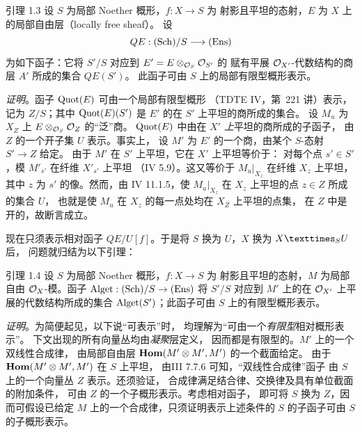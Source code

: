 \begin{enonce*}{引理 1.3}
设 $S$ 为局部 Noether 概形，$f:X\rightarrow S$ 为
射影且平坦的态射，$E$ 为 $X$ 上的局部自由层（locally free sheaf）。
设
$$
QE:(\operatorname{Sch})/S\longrightarrow(\operatorname{Ens})
$$
为如下函子：它将 $S'/S$ 对应到 $E'=E\otimes_{{\mathcal O}_S}{\mathcal O}_{S'}$ 的
赋有平展 ${\mathcal O}_{X'}$-代数结构的商层 $A'$ 所成的集合 $QE(S')$。
此函子可由 $S$ 上的局部有限型概形表示。
\end{enonce*}

\noindent
\emph{证明}。\pageoriginale 函子 $\protect\mathcal{\operatorname{Quot}}(E)$ 可由一个局部有限型概形
（TDTE IV，第~221 讲）表示，记为 $Z/S$；其中
$\protect\mathcal{\operatorname{Quot}}(E)(S')$ 是 $E'$ 的在 $S'$ 上平坦的商所成的集合。
设 $M_u$ 为 $X_Z$ 上 $E\otimes_{{\mathcal O}_S}{\mathcal O}_Z$ 的“泛”商。
$\protect\mathcal{\operatorname{Quot}}(E)$ 中由在 $X'$ \emph{上}平坦的商所成的子函子，
由 $Z$ 的一个开子集 $U$ 表示。事实上，
设 $M'$ 为 $E'$ 的一个商，由某个 $S$-态射 $S'\rightarrow Z$ 给定。
由于 $M'$ 在 $S'$ 上平坦，它在 $X'$ 上平坦等价于：
对每个点 $s'\in S'$，模 $M'_{s'}$ 在纤维 $X'_{s'}$ 上平坦
（\EGA IV 5.9）。这又等价于
$M_u|_{X_z}$ 在纤维 $X_z$ 上平坦，其中 $z$ 为
$s'$ 的像。然而，由 \EGA IV 11.1.5，使
$M_u|_{X_z}$ 在 $X_z$ 上平坦的点 $z\in Z$ 所成的集合 $U$，
也就是使 $M_u$ 在 $X_z$ 的每一点处均在 $X_Z$ 上平坦的点集，
在 $Z$ 中是开的，故断言成立。

现在只须表示相对函子 $QE/U[f]$。于是将
$S$ 换为 $U$，$X$ 换为 $\fprod{X}{U}{S}$ 后，
问题就归结为以下引理：

\begin{enonce*}{引理 1.4}
设 $S$ 为局部 Noether 概形，$f:X\rightarrow S$ 为
射影且平坦的态射，$M$ 为局部自由
${\mathcal O}_X$-模。函子
$\operatorname{Alget}:(\operatorname{Sch})/S\rightarrow(\operatorname{Ens})$ 将 $S'/S$ 对应到
$M'$ 上的在 ${\mathcal O}_{X'}$ 上平展的代数结构所成的集合
$\operatorname{Alget}(S')$；此函子可由 $S$ 上的有限型概形表示。
\end{enonce*}

\noindent
\emph{证明}。为简便起见，以下说“可表示”时，
均理解为“可由一个\emph{有限型}相对概形表示”。
下文出现的所有向量丛均由\emph{凝聚}层定义，
因而都是有限型的。$M'$ 上的一个双线性合成律，
由局部自由层 $\operatorname{\mathbf{Hom}}(M'\otimes M',M')$ 的一个截面给定。
由于 $\operatorname{\mathbf{Hom}}(M'\otimes M',M')$ 在 $S$ 上平坦，
由\pageoriginale \EGA III 7.7.6 可知，“双线性合成律”函子
由 $S$ 上的一个向量丛 $Z$ 表示。还须验证，
合成律满足结合律、交换律及具有单位截面的附加条件，
可由 $Z$ 的一个子概形表示。考虑相对函子，
即可将 $S$ 换为 $Z$，因而可假设已给定
$M$ 上的一个合成律，只须证明表示上述条件的
$S$ 的子函子可由 $S$ 的子概形表示。

